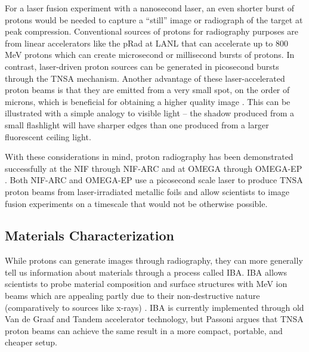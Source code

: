 For a laser fusion experiment with a nanosecond laser, an even shorter burst of protons would be needed to capture a ``still'' image or radiograph of the target at peak compression. Conventional sources of protons for radiography purposes are from linear accelerators like the pRad at \gls{LANL} that can accelerate up to 800 MeV protons \cite{LANL_PRAD} which can create microsecond or millisecond bursts of protons. In contrast, laser-driven proton sources can be generated in picosecond bursts through the \gls{TNSA} mechanism. Another advantage of these laser-accelerated proton beams is that they are emitted from a very small spot, on the order of microns, which is beneficial for obtaining a higher quality image \cite{Schaeffer_2023_RevMod}. This can be illustrated with a simple analogy to visible light -- the shadow produced from a small flashlight will have sharper edges than one produced from a larger fluorescent ceiling light.

With these considerations in mind, proton radiography has been demonstrated successfully at the \gls{NIF} through \gls{NIF-ARC} \cite{Simpson_2021_PPCF} and at OMEGA through \gls{OMEGA-EP} \cite{Zylstra_2012_RSI}. Both \gls{NIF-ARC} and \gls{OMEGA-EP} use a picosecond scale laser to produce \gls{TNSA} proton beams from laser-irradiated metallic foils and allow scientists to image fusion experiments on a timescale that would not be otherwise possible.

\subsection{Materials Characterization}

While protons can generate images through radiography, they can more generally tell us information about materials through a process called \gls{IBA}. \gls{IBA} allows scientists to probe material composition and surface structures with MeV ion beams which are appealing partly due to their non-destructive nature (comparatively to sources like x-rays) \cite{Passoni_2019_SciRep}. \gls{IBA} is currently implemented through old Van de Graaf and Tandem accelerator technology, but Passoni \cite{Passoni_2019_SciRep} argues that \gls{TNSA} proton beams can achieve the same result in a more compact, portable, and cheaper setup.

